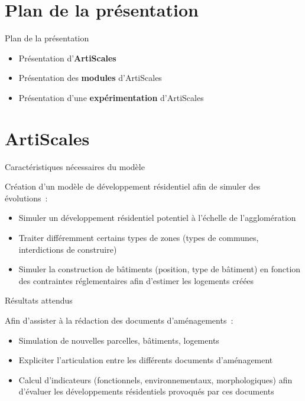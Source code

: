 \documentclass[xcolor=table]{beamer}
\begin{document}
\section[Plan]{Plan de la présentation}




\begin{frame}{Plan de la présentation}
	\begin{itemize}
		\item Présentation d'\textbf{ArtiScales}
		\item Présentation des \textbf{modules} d'ArtiScales
		\item Présentation d'une \textbf{expérimentation} d'ArtiScales
	\end{itemize}
\end{frame}




\section{ArtiScales}




\begin{frame}{Caractéristiques nécessaires du modèle}
\begin{block}{}
	Création d'un modèle de développement résidentiel afin de simuler des évolutions~:
	\begin{itemize}
		\item Simuler un développement résidentiel potentiel à l'échelle de l'agglomération 
		\item Traiter différemment certains types de zones (types de communes, interdictions de construire)
		\item Simuler la construction de bâtiments (position, type de bâtiment) en fonction des contraintes réglementaires afin d'estimer les logements créées 
	\end{itemize}
\end{block}
\end{frame}

\begin{frame}{Résultats attendus}
\begin{block}{}
Afin d'assister à la rédaction des documents d'aménagements~:
\begin{itemize}
	\item Simulation de nouvelles parcelles, bâtiments, logements 
	\item Expliciter l'articulation entre les différents documents d'aménagement
	\item Calcul d'indicateurs (fonctionnels, environnementaux, morphologiques) afin d'évaluer les développements résidentiels provoqués par ces documents
\end{itemize}
\end{block}
\end{frame}
\end{document}
